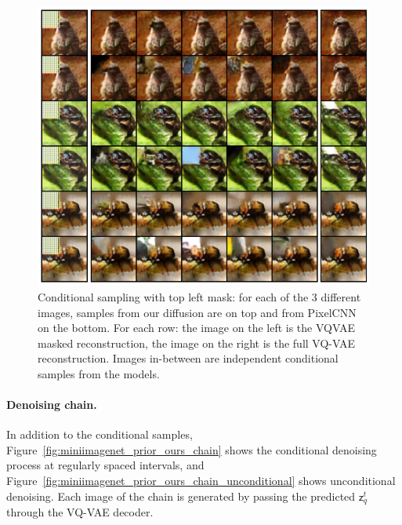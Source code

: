 \documentclass[nolayout]{article}
\theoremstyle{plain}
\theoremstyle{definition}
\theoremstyle{remark}
\newcommand{\latentdis}{\mathsf{z}_q}
\begin{document}
\begin{figure}
    \centering
    \includegraphics[width=\linewidth]{images/ours/cond_samples_topleft.png}

    \caption{Conditional sampling with top left mask: for each of the 3 different images, samples from our diffusion are on top and from PixelCNN on the bottom. For each row: the image on the left is the VQVAE masked reconstruction, the image on the right is the full VQ-VAE reconstruction. Images in-between are independent conditional samples from the models.}
    \label{fig:miniimagenet_prior_ours_conditional:topleft}
\end{figure}


\paragraph{Denoising chain. }
In addition to the conditional samples, Figure~\ref{fig:miniimagenet_prior_ours_chain} shows the conditional denoising process at regularly spaced intervals, and Figure~\ref{fig:miniimagenet_prior_ours_chain_unconditional} shows unconditional denoising. Each image of the chain is generated by passing the predicted $\latentdis^t$ through the VQ-VAE decoder.
\end{document}
